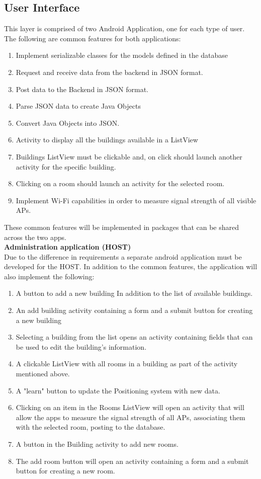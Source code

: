 \subsection{User Interface}
This layer is comprised of two Android Application, one for each type of user.
\\
The following are common features for both applications:
\begin{enumerate}
\item Implement serializable classes for the models defined in the database
\item Request and receive data from the backend in JSON format.
\item Post data to the Backend in JSON format.
\item Parse JSON data to create Java Objects
\item Convert Java Objects into JSON.
\item Activity to display all the buildings available in a ListView
\item Buildings ListView must be clickable and, on click should launch another activity for the specific building.
\item Clicking on a room should launch an activity for the selected room.
\item Implement Wi-Fi capabilities in order to measure signal strength of all visible APs.
\end{enumerate}
These common features will be implemented in packages that can be shared across the two apps.
\\
\textbf{Administration application (HOST)}
\\
Due to the difference in requirements a separate android application must be developed for the HOST. In addition to the common features, the application will also implement the following:
\begin{enumerate}
\item A button to add a new building In addition to the list of available buildings.
\item An add building activity containing a form and a submit button for creating a new building
\item Selecting a building from the list opens an activity containing fields that can be used to edit the building’s information.
\item A clickable ListView with all rooms in a building as part of the activity mentioned above.
\item A "learn" button to update the Positioning system with new data.
\item Clicking on an item in the Rooms ListView will open an activity that will allow the apps to measure the signal strength of all APs, associating them with the selected room, posting to the database.
\item A button in the Building activity to add new rooms.
\item The add room button will open an activity containing a form and a submit button for creating a new room.
\end{enumerate}

